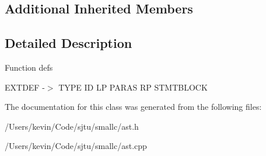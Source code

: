 \subsection*{Additional Inherited Members}


\subsection{Detailed Description}
Function defs

E\+X\+T\+D\+EF -\/$>$ T\+Y\+PE ID LP P\+A\+R\+AS RP S\+T\+M\+T\+B\+L\+O\+CK 

The documentation for this class was generated from the following files\+:\begin{DoxyCompactItemize}
\item 
/\+Users/kevin/\+Code/sjtu/smallc/ast.\+h\item 
/\+Users/kevin/\+Code/sjtu/smallc/ast.\+cpp\end{DoxyCompactItemize}
